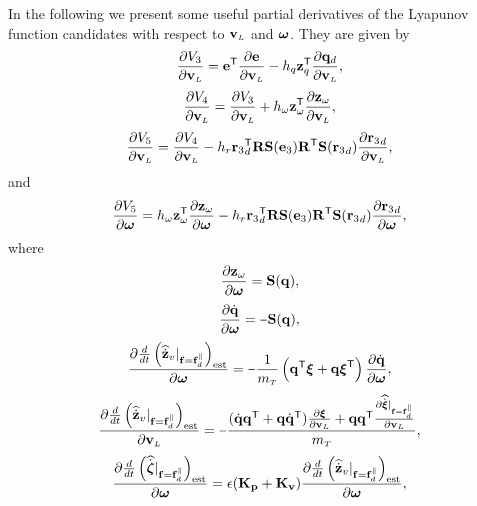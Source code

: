 \documentclass[journal,onecolumn]{IEEEtran}
\newcommand{\minus}{\scalebox{0.75}[1.0]{$-$}}
\begin{document}
	In the following we present some useful partial derivatives of the Lyapunov function candidates with respect to $\vL$ and $\wL$.
	They are given by
	\begin{equation}
		\frac{\partial V_3}{\partial\vL} = {\bf e}\trs\frac{\partial{\bf e}}{\partial\vL} -  h_{q}\zdir[T]\frac{\partial\dird}{\partial\vL},
		\label{eq:partial_V3_vL}
	\end{equation}
	\begin{equation}
		\frac{\partial V_4}{\partial\vL} = \frac{\partial V_3}{\partial\vL} + h_{\omega}\zw[T]\frac{\partial\zw}{\partial\vL},
		\label{eq:partial_V4_vL}
	\end{equation}
	\begin{equation}
		\frac{\partial V_5}{\partial\vL} =\frac{\partial V_4}{\partial\vL} - h_{r}\rzd[T]\RotM\Skew{\ez}\RotM[T]\Skew{\rzd}\frac{\partial\rzd}{\partial\vL} ,
		\label{eq:partial_V5_vL}
	\end{equation}
	and
	\begin{equation}
		\frac{\partial V_5}{\partial\wL} = h_{\omega}\zw[T]\frac{\partial\zw}{\partial\wL}- h_{r}\rzd[T]\RotM\Skew{\ez}\RotM[T]\Skew{\rzd}\frac{\partial\rzd}{\partial\wL}, 
		\label{eq:partial_V5_wL}
	\end{equation}
	where
	\begin{equation}
		\frac{\partial\zw}{\partial\wL} = \Skew{\dir},
	\end{equation}
	\begin{equation}
		\frac{\partial\dirdot}{\partial\wL} = \minus\Skew{\dir},
	\end{equation}
	\begin{equation}
		\frac{\partial\frac{d}{dt}\LP\zvdothatdot|_{\f=\fd^{\|}}\RP_{\text{est}}}{\partial\wL} = \minus\frac{1}{\mT}\LP\dir[T]\Xiq+\dir\Xiq[T]\RP\frac{\partial\dirdot}{\partial\wL},
	\end{equation}
	\begin{equation}
		\frac{\partial\frac{d}{dt}\LP\zvdothatdot|_{\f=\fd^{\|}}\RP_{\text{est}}}{\partial\vL} = \minus\frac{(\dirdot\dir[T]+\dir\dirdot[T])\frac{\partial\Xiq}{\partial\vL}+\dir\dir[T]\frac{\partial\widehat{\dot{\Xiq}}|_{\f=\fd^{\|}}}{\partial\vL}}{\mT},
	\end{equation}
	\begin{equation}
		\frac{\partial\frac{d}{dt}\LP\widehat{\dot{\bs{\zeta}}}|_{\f=\fd^{\|}}\RP_{\text{est}}}{\partial\wL} = \epsilon(\v{K}_\v{p} + \v{K}_\v{v} )\frac{\partial\frac{d}{dt}\LP\zvdothatdot|_{\f=\fd^{\|}}\RP_{\text{est}}}{\partial\wL},
	\end{equation}
\end{document}
